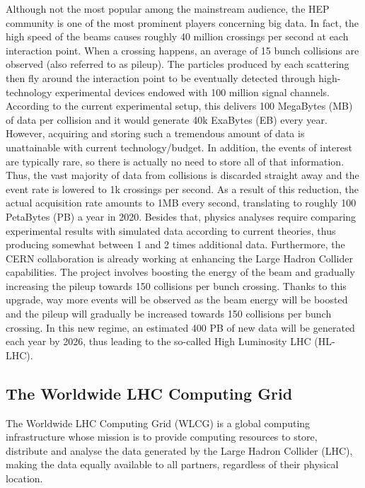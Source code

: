Although not the most popular among the mainstream audience, the HEP community is one of the most prominent players concerning big data.
In fact, the high speed of the beams causes roughly 40 million crossings per second at each interaction point. 
When a crossing happens, an average of 15 bunch collisions are observed  (also referred to as pileup). The particles produced by each scattering then fly around the interaction point to be eventually detected through high-technology experimental devices endowed with 100 million signal channels.
According to the current experimental setup, this delivers 100 MegaBytes (MB) of data per collision and it would generate 40k ExaBytes (EB) every year.
However, acquiring and storing such a tremendous amount of data is unattainable with current technology/budget. In addition, the events of interest are typically rare, so there is actually no need to store all of that information.
Thus, the vast majority of data from collisions is discarded straight away and the event rate is lowered to 1k crossings per second. 
As a result of this reduction, the actual acquisition rate amounts to 1MB every second, translating to roughly 100 PetaBytes (PB) a year in 2020.
Besides that, physics analyses require comparing experimental results with simulated data according to current theories, thus producing somewhat between 1 and 2 times additional data.
Furthermore, the CERN collaboration is already working at enhancing the Large Hadron Collider capabilities.
The project involves boosting the energy of the beam and gradually increasing the pileup towards 150 collisions per bunch crossing.
Thanks to this upgrade, way more events will be observed as the beam energy will be boosted and the pileup will gradually be increased towards 150 collisions per bunch crossing.
In this new regime, an estimated 400 PB of new data will be generated each year by 2026, thus leading to the so-called High Luminosity LHC (HL-LHC).



\subsection{The Worldwide LHC Computing Grid}

The Worldwide LHC Computing Grid (WLCG) is a global computing infrastructure whose mission is to provide computing resources to store, distribute and analyse the data generated by the Large Hadron Collider (LHC), making the data equally available to all partners, regardless of their physical location.

